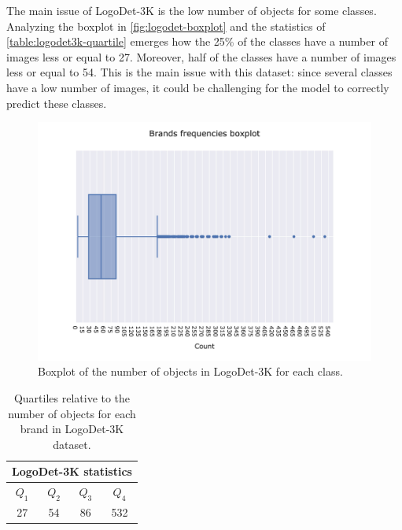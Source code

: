 The main issue of LogoDet-3K is the low number of objects for some classes. Analyzing the boxplot in \autoref{fig:logodet-boxplot} and the statistics of \autoref{table:logodet3k-quartile} emerges how the 25\% of the classes have a number of images less or equal to 27. Moreover, half of the classes have a number of images less or equal to 54. This is the main issue with this dataset: since several classes have a low number of images, it could be challenging for the model to correctly predict these classes.  



\begin{figure}[ht]
	\centering

    \begin{center}
        \includegraphics[width=\columnwidth]{images/box_plot.jpeg}
    \end{center}
	\caption{Boxplot of the number of objects in LogoDet-3K for each class.}%
	\label{fig:logodet-boxplot}%
\end{figure}


\begin{table}[ht]
    \centering
    \begin{tabular}{c  c  c  c } 
     \hline
     \multicolumn{4}{c}{LogoDet-3K statistics}\\
     \hline
     \textbf{$Q_1$} & \textbf{$Q_2$} & \textbf{$Q_3$} & \textbf{$Q_4$} \\
     \hline
     27 & 54 & 86 & 532 \\
    \end{tabular}
    \caption{Quartiles relative to the number of objects for each brand in LogoDet-3K dataset.}
    \label{table:logodet3k-quartile}
\end{table}

